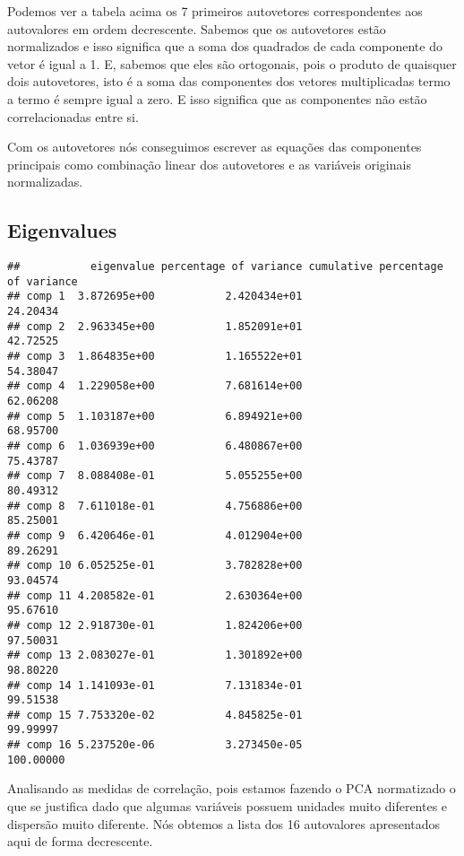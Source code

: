 \documentclass[
]{article}
\begin{document}
Podemos ver a tabela acima os 7 primeiros autovetores correspondentes aos autovalores em ordem decrescente. Sabemos que os autovetores estão normalizados e isso significa que a soma dos quadrados de cada componente do vetor é igual a 1. E, sabemos que eles são ortogonais, pois o produto de quaisquer dois autovetores, isto é a soma das componentes dos vetores multiplicadas termo a termo é sempre igual a zero. E isso significa que as componentes não estão correlacionadas entre si.

Com os autovetores nós conseguimos escrever as equações das componentes principais como combinação linear dos autovetores e as variáveis originais normalizadas.

\hypertarget{eigenvalues}{%
\subsection{Eigenvalues}\label{eigenvalues}}

\begin{verbatim}
##           eigenvalue percentage of variance cumulative percentage of variance
## comp 1  3.872695e+00           2.420434e+01                          24.20434
## comp 2  2.963345e+00           1.852091e+01                          42.72525
## comp 3  1.864835e+00           1.165522e+01                          54.38047
## comp 4  1.229058e+00           7.681614e+00                          62.06208
## comp 5  1.103187e+00           6.894921e+00                          68.95700
## comp 6  1.036939e+00           6.480867e+00                          75.43787
## comp 7  8.088408e-01           5.055255e+00                          80.49312
## comp 8  7.611018e-01           4.756886e+00                          85.25001
## comp 9  6.420646e-01           4.012904e+00                          89.26291
## comp 10 6.052525e-01           3.782828e+00                          93.04574
## comp 11 4.208582e-01           2.630364e+00                          95.67610
## comp 12 2.918730e-01           1.824206e+00                          97.50031
## comp 13 2.083027e-01           1.301892e+00                          98.80220
## comp 14 1.141093e-01           7.131834e-01                          99.51538
## comp 15 7.753320e-02           4.845825e-01                          99.99997
## comp 16 5.237520e-06           3.273450e-05                         100.00000
\end{verbatim}

Analisando as medidas de correlação, pois estamos fazendo o PCA normatizado o que se justifica dado que algumas variáveis possuem unidades muito diferentes e dispersão muito diferente. Nós obtemos a lista dos 16 autovalores apresentados aqui de forma decrescente.
\end{document}
